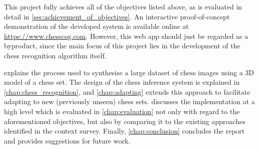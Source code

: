 This project fully achieves all of the objectives listed above, as is evaluated in detail in \cref{sec:achievement_of_objectives}.
An interactive proof-of-concept demonstration of the developed system is available online at \url{https://www.chesscog.com}.
However, this web app should just be regarded as a byproduct, since the main focus of this project lies in the development of the chess recognition algorithm itself.

 explains the process used to synthesise a large dataset of chess images using a 3D model of a chess set.
The design of the chess inference system is explained in \cref{chap:chess_recognition}, and \cref{chap:adapting} extends this approach to facilitate adapting to new (previously unseen) chess sets.
 discusses the implementation at a high level which is evaluated in \cref{chap:evaluation} not only with regard to the aforementioned objectives, but also by comparing it to the existing approaches identified in the context survey.
Finally, \cref{chap:conclusion} concludes the report and provides suggestions for future work.